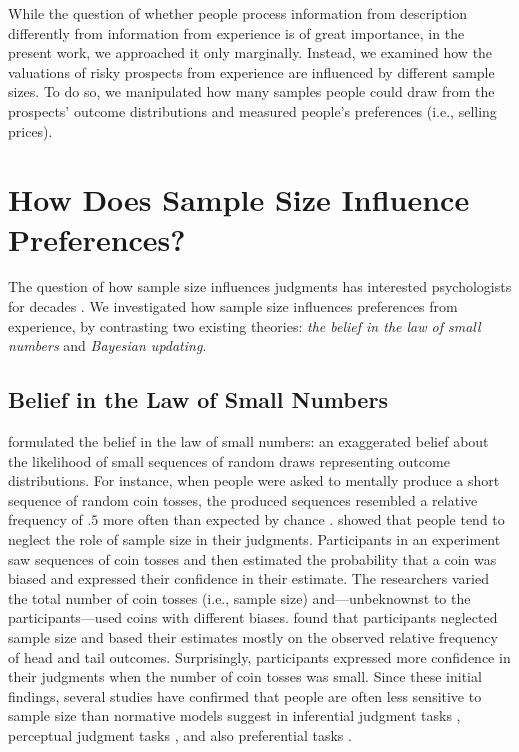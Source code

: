 \documentclass[a4paper, man, natbib, floatsintext]{apa6} %
\begin{document}
While the question of whether people process information from description differently from information from experience is of great importance, in the present work, we approached it only marginally. Instead, we examined how the valuations of risky prospects from experience are influenced by different sample sizes. To do so, we manipulated how many samples people could draw from the prospects' outcome distributions and measured people's preferences (i.e., selling prices).



\section{How Does Sample Size Influence Preferences?}
The question of how sample size influences judgments has interested psychologists for decades \citep[e.g.,][]{Tversky1971, Griffin1992}. We investigated how sample size influences preferences from experience, by contrasting two existing theories: \textit{the belief in the law of small numbers} \citep{Tversky1971} and \textit{Bayesian updating}. 

\subsection{Belief in the Law of Small Numbers}
\cite{Tversky1971} formulated the belief in the law of small numbers: an exaggerated belief about the likelihood of small sequences of random draws representing outcome distributions. %
For instance, when people were asked to mentally produce a short sequence of random coin tosses, the produced sequences resembled a relative frequency of $.5$ more often than expected by chance \citep{Tversky1971}. \cite{Griffin1992} showed that people tend to neglect the role of sample size in their judgments. Participants in an experiment saw sequences of coin tosses and then estimated the probability that a coin was biased and expressed their confidence in their estimate. The researchers varied the total number of coin tosses (i.e., sample size) and---unbeknownst to the participants---used coins with different biases. \cite{Griffin1992} found that participants neglected sample size and based their estimates mostly on the observed relative frequency of head and tail outcomes. Surprisingly, participants expressed more confidence in their judgments when the number of coin tosses was small. Since these initial findings, several studies have confirmed that people are often less sensitive to sample size than normative models suggest in inferential judgment tasks \citep[e.g.,][]{Kutzner2016}, perceptual judgment tasks \citep[e.g.,][]{Kvam2016}, and also preferential tasks \citep[e.g.,][]{Powell2017}.
\end{document}
